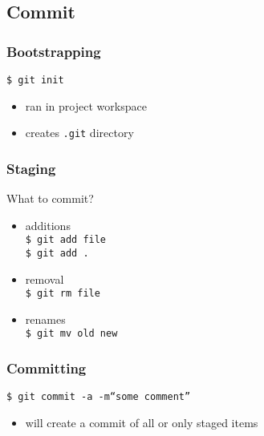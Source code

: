 \documentclass[english]{beamer}
\newcommand{\mysubsection}[2]{%
  \hypertarget{#2}{}%
  \subsection{#1}%
  \label{#2}%
}
\newcommand{\CMD}[1]{%
\texttt{\textcolor{code-green}{#1}}%
}
\newcommand{\fnt}[1]{%
\texttt{\textcolor{code-gray}{#1}}%
}
\newcommand{\faint}[1]{%
\textcolor{code-gray}{#1}%
}
\begin{document}
\mysubsection{Commit}{using:commit}
\begin{frame}
\frametitle{Bootstrapping}

\CMD{\$ git init} \\
\begin{itemize}
        \item ran in project workspace
        \item creates \CMD{.git} directory
\end{itemize}
\end{frame}

\begin{frame}
\frametitle{Staging}

What to commit?

\pause{}
\vspace{.1\textheight}

\begin{itemize}
        \item additions \\
                \CMD{\$ git add file} \\
                \CMD{\$ git add .}

                \pause{}
                \vspace{.1\textheight}

        \item removal \\
                \CMD{\$ git rm file}

                \pause{}
                \vspace{.1\textheight}

        \item renames \\
                \CMD{\$ git mv old new}
\end{itemize}
\end{frame}

\begin{frame}
\frametitle{Committing}

\CMD{\$ git commit \fnt{-a} -m``some comment''} \\
\begin{itemize}
        \item will create a commit of \faint{all or} only staged items
\end{itemize}
\end{frame}
\end{document}
